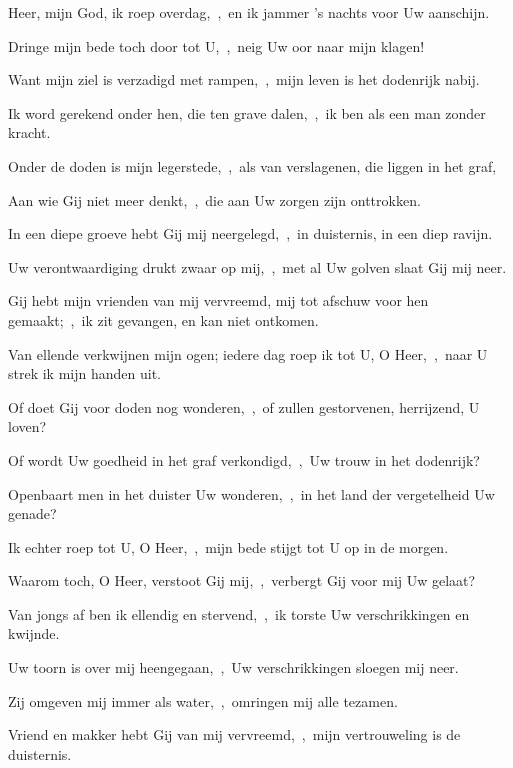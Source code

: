 \documentclass[12pt,twoside,a5paper]{article}
\begin{document}

\begin{halfparskip}

  Heer, mijn God, ik roep overdag,~\sep\ en ik jammer 's nachts voor Uw aanschijn.


  Dringe mijn bede toch door tot U,~\sep\ neig Uw oor naar mijn klagen!

  Want mijn ziel is verzadigd met rampen,~\sep\ mijn leven is het dodenrijk nabij.

  Ik word gerekend onder hen, die ten grave dalen,~\sep\ ik ben als een man zonder kracht.

  Onder de doden is mijn legerstede,~\sep\ als van verslagenen, die liggen in het graf,

  Aan wie Gij niet meer denkt,~\sep\ die aan Uw zorgen zijn onttrokken.

  In een diepe groeve hebt Gij mij neergelegd,~\sep\ in duisternis, in een diep ravijn.

  Uw verontwaardiging drukt zwaar op mij,~\sep\ met al Uw golven slaat Gij mij neer.

  Gij hebt mijn vrienden van mij vervreemd, mij tot afschuw voor hen gemaakt;~\sep\ ik zit gevangen, en kan niet ontkomen.
\end{halfparskip}

\begin{halfparskip}

  Van ellende verkwijnen mijn ogen; iedere dag roep ik tot U, O Heer,~\sep\ naar U strek ik mijn handen uit.

  Of doet Gij voor doden nog wonderen,~\sep\ of zullen gestorvenen, herrijzend, U loven?

  Of wordt Uw goedheid in het graf verkondigd,~\sep\ Uw trouw in het dodenrijk?

  Openbaart men in het duister Uw wonderen,~\sep\ in het land der vergetelheid Uw genade?
\end{halfparskip}

\begin{halfparskip}

  Ik echter roep tot U, O Heer,~\sep\ mijn bede stijgt tot U op in de morgen.

  Waarom toch, O Heer, verstoot Gij mij,~\sep\ verbergt Gij voor mij Uw gelaat?

  Van jongs af ben ik ellendig en stervend,~\sep\ ik torste Uw verschrikkingen en kwijnde.

  Uw toorn is over mij heengegaan,~\sep\ Uw verschrikkingen sloegen mij neer.

  Zij omgeven mij immer als water,~\sep\ omringen mij alle tezamen.

  Vriend en makker hebt Gij van mij vervreemd,~\sep\ mijn vertrouweling is de duisternis.
\end{halfparskip}
\end{document}
